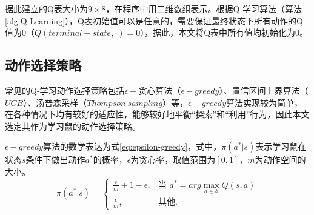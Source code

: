 据此建立的Q表大小为$9\times8$，在程序中用二维数组表示。根据Q-学习算法（算法\ref{alg:Q-Learning}），Q表初始值可以是任意的，需要保证最终状态下所有动作的Q值为0（$Q\left(terminal-state, ·\right)=0$）\cite{ISI:000481873900002}，据此，本文将Q表中所有值均初始化为0。
\subsection{动作选择策略}
常见的Q-学习动作选择策略包括$\epsilon-$贪心算法（$\epsilon-greedy$）、置信区间上界算法（$UCB$）、汤普森采样（$Thompson~sampling$）等，$\epsilon-greedy$算法实现较为简单，在各种情况下均有较好的适应性，能够较好地平衡“探索”和“利用”行为，因此本文选定其作为学习鼠的动作选择策略。

$\epsilon-greedy$算法的数学表达为式\ref{eq:epsilon-greedy}，式中，$\pi\left(a^{*}|s\right)$表示学习鼠在状态$s$条件下做出动作$a^{*}$的概率，$\epsilon$为贪心率，取值范围为$[0,1]$，$m$为动作空间的大小。
\begin{equation}\label{eq:epsilon-greedy}
  \pi\left(a^{*}|s\right)=\begin{cases}
                        \displaystyle\frac{\epsilon}{m}+1-\epsilon, & \mbox{当 $a^{*}=arg\max\limits_{a\in \mathbb{A}}Q(s,a)$}  \\
                        \displaystyle\frac{\epsilon}{m}, & \mbox{其他}.
                      \end{cases}
\end{equation}



